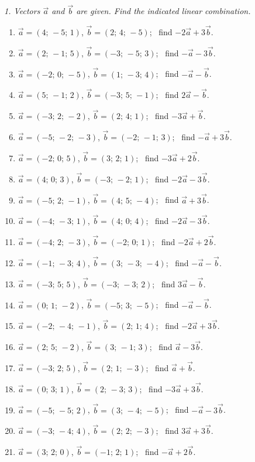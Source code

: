\emph{1. Vectors $\vec a$ and $\vec b$ are given. Find the indicated linear combination.}
\bigskip
\begin{enumerate}[label=\arabic*., leftmargin=*]
\item $\vec a=(4;\,-5;\,1)$, $\vec b=(2;\,4;\,-5)$; \ find $-2\vec a+3\vec b$.
\item $\vec a=(2;\,-1;\,5)$, $\vec b=(-3;\,-5;\,3)$; \ find $-\vec a-3\vec b$.
\item $\vec a=(-2;\,0;\,-5)$, $\vec b=(1;\,-3;\,4)$; \ find $-\vec a-\vec b$.
\item $\vec a=(5;\,-1;\,2)$, $\vec b=(-3;\,5;\,-1)$; \ find $2\vec a-\vec b$.
\item $\vec a=(-3;\,2;\,-2)$, $\vec b=(2;\,4;\,1)$; \ find $-3\vec a+\vec b$.
\item $\vec a=(-5;\,-2;\,-3)$, $\vec b=(-2;\,-1;\,3)$; \ find $-\vec a+3\vec b$.
\item $\vec a=(-2;\,0;\,5)$, $\vec b=(3;\,2;\,1)$; \ find $-3\vec a+2\vec b$.
\item $\vec a=(4;\,0;\,3)$, $\vec b=(-3;\,-2;\,1)$; \ find $-2\vec a-3\vec b$.
\item $\vec a=(-5;\,2;\,-1)$, $\vec b=(4;\,5;\,-4)$; \ find $\vec a+3\vec b$.
\item $\vec a=(-4;\,-3;\,1)$, $\vec b=(4;\,0;\,4)$; \ find $-2\vec a-3\vec b$.
\item $\vec a=(-4;\,2;\,-3)$, $\vec b=(-2;\,0;\,1)$; \ find $-2\vec a+2\vec b$.
\item $\vec a=(-1;\,-3;\,4)$, $\vec b=(3;\,-3;\,-4)$; \ find $-\vec a-\vec b$.
\item $\vec a=(-3;\,5;\,5)$, $\vec b=(-3;\,-3;\,2)$; \ find $3\vec a-\vec b$.
\item $\vec a=(0;\,1;\,-2)$, $\vec b=(-5;\,3;\,-5)$; \ find $-\vec a-\vec b$.
\item $\vec a=(-2;\,-4;\,-1)$, $\vec b=(2;\,1;\,4)$; \ find $-2\vec a+3\vec b$.
\item $\vec a=(2;\,5;\,-2)$, $\vec b=(3;\,-1;\,3)$; \ find $\vec a-3\vec b$.
\item $\vec a=(-3;\,2;\,5)$, $\vec b=(2;\,1;\,-3)$; \ find $\vec a+\vec b$.
\item $\vec a=(0;\,3;\,1)$, $\vec b=(2;\,-3;\,3)$; \ find $-3\vec a+3\vec b$.
\item $\vec a=(-5;\,-5;\,2)$, $\vec b=(3;\,-4;\,-5)$; \ find $-\vec a-3\vec b$.
\item $\vec a=(-3;\,-4;\,4)$, $\vec b=(2;\,2;\,-3)$; \ find $3\vec a+3\vec b$.
\item $\vec a=(3;\,2;\,0)$, $\vec b=(-1;\,2;\,1)$; \ find $-\vec a+2\vec b$.

\end{enumerate}
